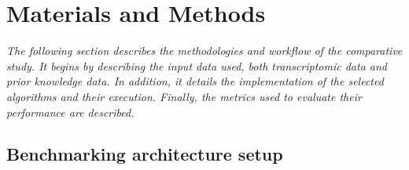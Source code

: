 ﻿%

%


\chapter{Materials and Methods}
\label{cha:materialsandmethods}


\textit{The following section describes the methodologies and workflow of the comparative study. It begins by describing the input data used, both transcriptomic data and prior knowledge data. In addition, it details the implementation of the selected algorithms and their execution. Finally, the metrics used to evaluate their performance are described.}

\section{Benchmarking architecture setup} %
\label{sec:benchmarkingarchitecturesetup}

